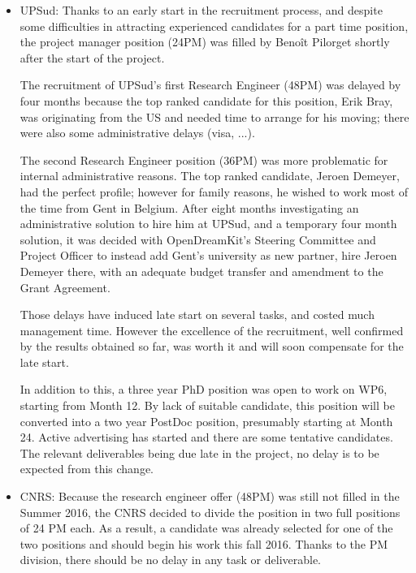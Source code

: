 \documentclass{deliverablereport}
\begin{document}
\begin{itemize}
\item{UPSud:}
  Thanks to an early start in the recruitment process, and despite
  some difficulties in attracting experienced candidates for a part
  time position, the project manager position (24PM) was filled by
  Benoît Pilorget shortly after the start of the project.

  The recruitment of UPSud's first Research Engineer (48PM) was
  delayed by four months because the top ranked candidate for this
  position, Erik Bray, was originating from the US and needed time to
  arrange for his moving; there were also some administrative delays
  (visa, ...).

  The second Research Engineer position (36PM) was more problematic
  for internal administrative reasons. The top ranked candidate,
  Jeroen Demeyer, had the perfect profile; however for family reasons,
  he wished to work most of the time from Gent in Belgium. After eight
  months investigating an administrative solution to hire him at
  UPSud, and a temporary four month solution, it was decided with
  OpenDreamKit's Steering Committee and Project Officer to instead add
  Gent's university as new partner, hire Jeroen Demeyer there, with an
  adequate budget transfer and amendment to the Grant Agreement.

  Those delays have induced late start on several tasks, and costed
  much management time. However the excellence of the recruitment, well
  confirmed by the results obtained so far, was worth it and will soon
  compensate for the late start.

  In addition to this, a three year PhD position was open to work on WP6, starting from
  Month 12. By lack of suitable candidate, this position will be
  converted into a two year PostDoc position, presumably starting at
  Month 24. Active advertising has started and there are some
  tentative candidates. The relevant deliverables being due late in
  the project, no delay is to be expected from this change.\\

\item{CNRS:} Because the research engineer offer (48PM) was still not filled
  in the Summer 2016, the CNRS decided to divide the position in two full
  positions of 24 PM each. As a result, a candidate was already selected for
  one of the two positions and should begin his work this fall 2016.
  Thanks to the PM division, there should be no delay in any task or
  deliverable. \\


\end{itemize}
\end{document}
